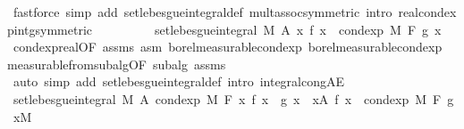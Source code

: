 \begin{isabellebody}
\ {\isacharparenleft}{\kern0pt}fastforce\ simp\ add{\isacharcolon}{\kern0pt}\ set{\isacharunderscore}{\kern0pt}lebesgue{\isacharunderscore}{\kern0pt}integral{\isacharunderscore}{\kern0pt}def\ mult{\isachardot}{\kern0pt}assoc{\isacharbrackleft}{\kern0pt}symmetric{\isacharbrackright}{\kern0pt}\ intro{\isacharcolon}{\kern0pt}\ real{\isacharunderscore}{\kern0pt}cond{\isacharunderscore}{\kern0pt}exp{\isacharunderscore}{\kern0pt}intg{\isacharparenleft}{\kern0pt}{}{\isacharparenright}{\kern0pt}{\isacharbrackleft}{\kern0pt}symmetric{\isacharbrackright}{\kern0pt}{\isacharparenright}{\kern0pt}\isanewline
\ \ \ \ \isamarkupfalse%
\ \isamarkupfalse%
\ {\isachardoublequoteopen}{\isachardot}{\kern0pt}{\isachardot}{\kern0pt}{\isachardot}{\kern0pt}\ {\isacharequal}{\kern0pt}\ set{\isacharunderscore}{\kern0pt}lebesgue{\isacharunderscore}{\kern0pt}integral\ M\ A\ {\isacharparenleft}{\kern0pt}{\isasymlambda}x{\isachardot}{\kern0pt}\ f\ x\ {\isacharasterisk}{\kern0pt}\ cond{\isacharunderscore}{\kern0pt}exp\ M\ F\ g\ x{\isacharparenright}{\kern0pt}{\isachardoublequoteclose}\ \isamarkupfalse%
\ cond{\isacharunderscore}{\kern0pt}exp{\isacharunderscore}{\kern0pt}real{\isacharbrackleft}{\kern0pt}OF\ assms{\isacharparenleft}{\kern0pt}{}{\isacharparenright}{\kern0pt}{\isacharbrackright}{\kern0pt}\ asm{\isacharprime}{\kern0pt}\ borel{\isacharunderscore}{\kern0pt}measurable{\isacharunderscore}{\kern0pt}cond{\isacharunderscore}{\kern0pt}exp{\isacharprime}{\kern0pt}\ borel{\isacharunderscore}{\kern0pt}measurable{\isacharunderscore}{\kern0pt}cond{\isacharunderscore}{\kern0pt}exp{}\ measurable{\isacharunderscore}{\kern0pt}from{\isacharunderscore}{\kern0pt}subalg{\isacharbrackleft}{\kern0pt}OF\ subalg\ assms{\isacharparenleft}{\kern0pt}{}{\isacharparenright}{\kern0pt}{\isacharbrackright}{\kern0pt}\ \isamarkupfalse%
\ {\isacharparenleft}{\kern0pt}auto\ simp\ add{\isacharcolon}{\kern0pt}\ set{\isacharunderscore}{\kern0pt}lebesgue{\isacharunderscore}{\kern0pt}integral{\isacharunderscore}{\kern0pt}def\ intro{\isacharcolon}{\kern0pt}\ integral{\isacharunderscore}{\kern0pt}cong{\isacharunderscore}{\kern0pt}AE{\isacharparenright}{\kern0pt}\isanewline
\ \ \ \ \isamarkupfalse%
\ \isamarkupfalse%
\ {\isachardoublequoteopen}set{\isacharunderscore}{\kern0pt}lebesgue{\isacharunderscore}{\kern0pt}integral\ M\ A\ {\isacharparenleft}{\kern0pt}cond{\isacharunderscore}{\kern0pt}exp\ M\ F\ {\isacharparenleft}{\kern0pt}{\isasymlambda}x{\isachardot}{\kern0pt}\ f\ x\ {\isacharasterisk}{\kern0pt}\ g\ x{\isacharparenright}{\kern0pt}{\isacharparenright}{\kern0pt}\ {\isacharequal}{\kern0pt}\ {\isasymintegral}x{\isasymin}A{\isachardot}{\kern0pt}\ {\isacharparenleft}{\kern0pt}f\ x\ {\isacharasterisk}{\kern0pt}\ cond{\isacharunderscore}{\kern0pt}exp\ M\ F\ g\ x{\isacharparenright}{\kern0pt}{\isasympartial}M{\isachardoublequoteclose}\ \isacommand{{\isachardot}{\kern0pt}}\isamarkupfalse%

\end{isabellebody}
